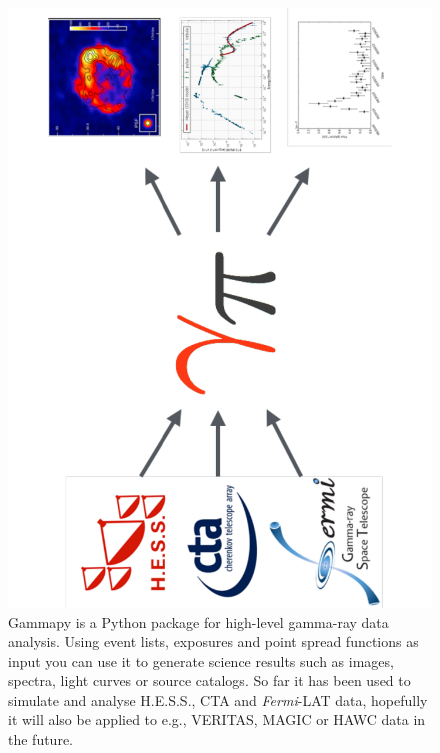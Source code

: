 \begin{figure}[t]
	\centering
	\includegraphics[height=0.5\textwidth,
		angle=270]{static/gammapy-big-picture} \caption{ Gammapy is a Python package
		for high-level gamma-ray data analysis. Using event lists, exposures and point
		spread functions as input you can use it to generate science results such as
		images, spectra, light curves or source catalogs. So far it has been used to
		simulate and analyse H.E.S.S., CTA and \textit{Fermi}-LAT data, hopefully it
		will also be applied to e.g., VERITAS, MAGIC or HAWC data in the future. }
	\label{fig:big-picture}

\end{figure}


